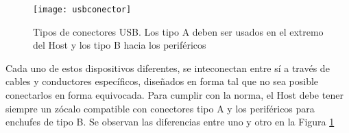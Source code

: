 \begin{figure}[b]
	\centering
	\texttt{[image: usbconector]}
	\caption{Tipos de conectores USB. Los tipo A deben ser usados en el extremo del Host y los tipo B hacia los periféricos\cite{USBHardwareWiki}}
	\label{fig:con}
\end{figure}

Cada uno de estos dispositivos diferentes, se inteconectan entre sí a través de cables y conductores específicos, diseñados en forma tal que no sea posible conectarlos en forma equivocada. Para cumplir con la norma, el Host debe tener siempre un zócalo compatible con conectores tipo A y los periféricos para enchufes de tipo B. Se observan las diferencias entre uno y otro en la Figura \ref{fig:con}